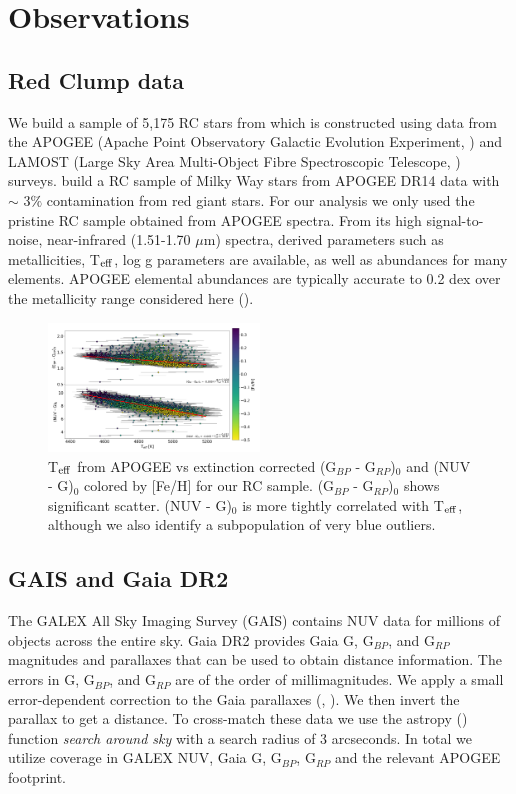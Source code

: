 \documentclass[twocolumn]{emulateapj}
\begin{document}
\section{Observations}
\subsection{Red Clump data}
We build a sample of 5,175 RC stars from \citealt{ting18} which is constructed using data from the APOGEE (Apache Point Observatory Galactic Evolution Experiment, \citealt{apogee2017}) and LAMOST (Large Sky Area Multi-Object Fibre Spectroscopic Telescope, \citealt{lamost}) surveys. \citealt{ting18} build a RC sample of Milky Way stars from APOGEE DR14 data with $\sim$ 3$\%$ contamination from red giant stars. For our analysis we only used the pristine RC sample obtained from APOGEE spectra. From its high signal-to-noise, near-infrared (1.51-1.70 $\mu$m) spectra, derived parameters such as metallicities, T$_{\rm{eff}}$, log g parameters are available, as well as abundances for many elements. APOGEE elemental abundances are typically accurate to 0.2 dex over the metallicity range considered here (\citealt{ASPCAP}).


\begin{figure}[] %
\centering
\includegraphics[width=0.5\textwidth]{f4.pdf}
\caption{T$_{\rm{eff}}$ from APOGEE vs extinction corrected (G$_{BP}$ - G$_{RP}$)$_0$ and (NUV - G)$_0$ colored by [Fe/H] for our RC sample. (G$_{BP}$ - G$_{RP}$)$_0$ shows significant scatter.  (NUV - G)$_0$ is more tightly correlated with T$_{\rm{eff}}$, although we also identify a subpopulation of very blue outliers.}
\end{figure}

\subsection{GAIS and Gaia DR2}
The GALEX All Sky Imaging Survey (GAIS) contains NUV data for millions of objects across the entire sky. Gaia DR2 provides Gaia G, G$_{BP}$, and G$_{RP}$ magnitudes and parallaxes that can be used to obtain distance information. The errors in G, G$_{BP}$, and G$_{RP}$ are of the order of millimagnitudes. We apply a small error-dependent correction to the Gaia parallaxes (\citealt{lutzkelker73}, \citealt{Oudmaijer98}). We then invert the parallax to get a distance. To cross-match these data we use the astropy (\citealt{astropy}) function \textit{search around sky} with a search radius of 3 arcseconds. In total we utilize coverage in GALEX NUV, Gaia G, G$_{BP}$, G$_{RP}$ and the relevant APOGEE footprint.
\end{document}
